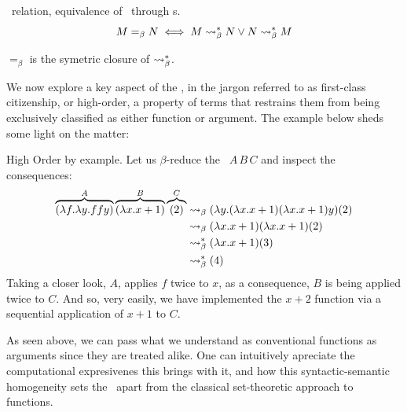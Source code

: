 \begin{definition} \bequiv \ relation, equivalence of \lterms \ through \bred s.
  \[
    M =_\beta N \iff M \mathrel{\leadsto}_\beta^* N \lor N \mathrel{\leadsto}_\beta^* M
  \]
\end{definition}
\begin{note}
  $=_\beta$ is the symetric closure of $\mathrel{\leadsto}_\beta^*$.
\end{note}
We now explore a key aspect of the \lcalc, in the jargon referred to as first-class citizenship, or high-order, a property of terms that restrains them from being exclusively classified as either function or argument. The example below sheds some light on the matter:
\begin{example} High Order by example. Let us $\beta$-reduce the \lterm \ $ A \, B \, C $ and inspect the consequences:
  \label{ex:high-order-by-example}
  \begin{align*}
    \overbrace { (\lambda f . \lambda y . f f y) }^{A} \overbrace{ (\lambda x . x + 1) }^{B} \overbrace{(2)}^{C}
    &\mathrel{\leadsto}_\beta (\lambda y .(\lambda x . x + 1) (\lambda x . x + 1)y)(2) \\
    &\mathrel{\leadsto}_\beta (\lambda x . x + 1)(\lambda x . x + 1)(2) \\
    &\mathrel{\leadsto}_\beta^* (\lambda x . x + 1) (3) \\
    &\mathrel{\leadsto}_\beta^* (4)
  \end{align*}
  Taking a closer look, $A$, applies $f$ twice to $x$, as a consequence, $B$ is being applied twice to $C$. And so, very easily, we have implemented the $ x + 2 $ function via a sequential application of $x + 1$ to $C$.
\end{example}
\begin{remark}
  As seen above, we can pass what we understand as conventional functions as arguments since they are treated alike.  One can intuitively apreciate the computational expresivenes this brings with it, and how this syntactic-semantic homogeneity sets the \lcalc \ apart from the classical set-theoretic approach to functions.
\end{remark}

